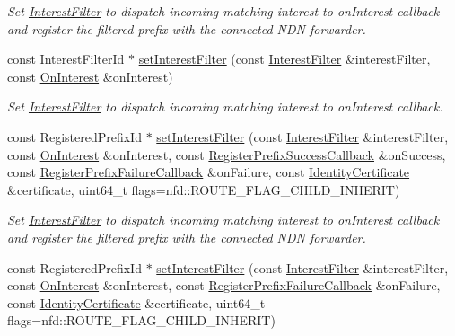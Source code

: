 \begin{DoxyCompactItemize}
\begin{DoxyCompactList}\small\item\em Set \hyperlink{classndn_1_1InterestFilter}{Interest\+Filter} to dispatch incoming matching interest to on\+Interest callback and register the filtered prefix with the connected N\+DN forwarder. \end{DoxyCompactList}\item 
const Interest\+Filter\+Id $\ast$ \hyperlink{classndn_1_1Face_a934f3080b7dc9e350f5e4536b27fc391}{set\+Interest\+Filter} (const \hyperlink{classndn_1_1InterestFilter}{Interest\+Filter} \&interest\+Filter, const \hyperlink{namespacendn_a6ddca075866d76508a3dd3b15533cac2}{On\+Interest} \&on\+Interest)
\begin{DoxyCompactList}\small\item\em Set \hyperlink{classndn_1_1InterestFilter}{Interest\+Filter} to dispatch incoming matching interest to on\+Interest callback. \end{DoxyCompactList}\item 
const Registered\+Prefix\+Id $\ast$ \hyperlink{classndn_1_1Face_a60ff36d057b56334527c3fd67f6dd748}{set\+Interest\+Filter} (const \hyperlink{classndn_1_1InterestFilter}{Interest\+Filter} \&interest\+Filter, const \hyperlink{namespacendn_a6ddca075866d76508a3dd3b15533cac2}{On\+Interest} \&on\+Interest, const \hyperlink{namespacendn_a80b158f94737f73bec3f9af27161e899}{Register\+Prefix\+Success\+Callback} \&on\+Success, const \hyperlink{namespacendn_a691d213d0f708593217feeae517f3e45}{Register\+Prefix\+Failure\+Callback} \&on\+Failure, const \hyperlink{classndn_1_1IdentityCertificate}{Identity\+Certificate} \&certificate, uint64\+\_\+t flags=nfd\+::\+R\+O\+U\+T\+E\+\_\+\+F\+L\+A\+G\+\_\+\+C\+H\+I\+L\+D\+\_\+\+I\+N\+H\+E\+R\+IT)
\begin{DoxyCompactList}\small\item\em Set \hyperlink{classndn_1_1InterestFilter}{Interest\+Filter} to dispatch incoming matching interest to on\+Interest callback and register the filtered prefix with the connected N\+DN forwarder. \end{DoxyCompactList}\item 
const Registered\+Prefix\+Id $\ast$ \hyperlink{classndn_1_1Face_a4bcd01a63a3fa6a4b73a0cd79950ccb2}{set\+Interest\+Filter} (const \hyperlink{classndn_1_1InterestFilter}{Interest\+Filter} \&interest\+Filter, const \hyperlink{namespacendn_a6ddca075866d76508a3dd3b15533cac2}{On\+Interest} \&on\+Interest, const \hyperlink{namespacendn_a691d213d0f708593217feeae517f3e45}{Register\+Prefix\+Failure\+Callback} \&on\+Failure, const \hyperlink{classndn_1_1IdentityCertificate}{Identity\+Certificate} \&certificate, uint64\+\_\+t flags=nfd\+::\+R\+O\+U\+T\+E\+\_\+\+F\+L\+A\+G\+\_\+\+C\+H\+I\+L\+D\+\_\+\+I\+N\+H\+E\+R\+IT)

\end{DoxyCompactItemize}
